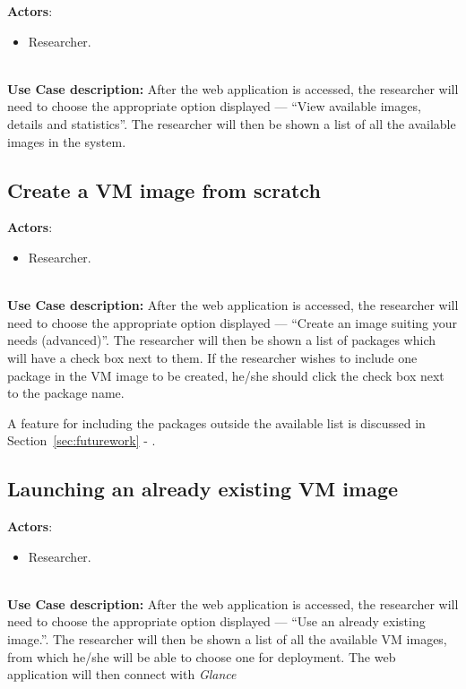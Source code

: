 \textbf{Actors}:

\begin{itemize}
\item Researcher.
\end{itemize}\ \\
\textbf{Use Case description:} After the web application is accessed, the researcher will need to choose the appropriate option displayed --- ``View available images, details and statistics''. The researcher will then be shown a list of all the available images in the system.

\subsection{Create a VM image from scratch}\label{subsec:uc3}

\textbf{Actors}:

\begin{itemize}
\item Researcher.
\end{itemize}\ \\
\textbf{Use Case description:} After the web application is accessed, the researcher will need to choose the appropriate option displayed --- ``Create an image suiting your needs (advanced)''. The researcher will then be shown a list of packages which will have a check box next to them. If the researcher wishes to include one package in the VM image to be created, he/she should click the check box next to the package name. 

A feature for including the packages outside the available list is discussed in Section~\ref{sec:futurework} - .


\subsection{Launching an already existing VM image}\label{subsec:uc4}

\textbf{Actors}:

\begin{itemize}
\item Researcher.
\end{itemize}\ \\
\textbf{Use Case description:} After the web application is accessed, the researcher will need to choose the appropriate option displayed --- ``Use an already existing image.''. The researcher will then be shown a list of all the available VM images, from which he/she will be able to choose one for deployment. The web application will then connect with \textit{Glance}


